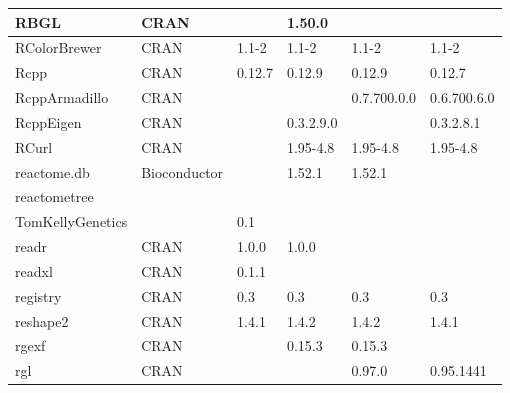 \begin{longtable}{|llllll|}
RBGL                          & CRAN                      &             & 1.50.0      &                &                   \\ \hline \rowcolor{gray!25}
RColorBrewer                  & CRAN                      & 1.1-2       & 1.1-2       & 1.1-2          & 1.1-2            \\ \hline
Rcpp                          & CRAN                      & 0.12.7      & 0.12.9      & 0.12.9         & 0.12.7            \\ \hline \rowcolor{gray!25}
RcppArmadillo                 & CRAN                      &             &             & 0.7.700.0.0    & 0.6.700.6.0      \\ \hline
RcppEigen                     & CRAN                      &             & 0.3.2.9.0   &                & 0.3.2.8.1         \\ \hline \rowcolor{gray!25}
RCurl                         & CRAN                      &             & 1.95-4.8    & 1.95-4.8       & 1.95-4.8         \\ \hline
reactome.db                   & Bioconductor              &             & 1.52.1      & 1.52.1         &                   \\ \hline \rowcolor{gray!25}
reactometree                  & \begin{tabular}[c]{@{}l@{}}GitHub \\ TomKellyGenetics \end{tabular}  &             & 0.1         &                &                  \\ \hline
readr                         & CRAN                      & 1.0.0       & 1.0.0       &                &                   \\ \hline \rowcolor{gray!25}
readxl                        & CRAN                      & 0.1.1       &             &                &                  \\ \hline
registry                      & CRAN                      & 0.3         & 0.3         & 0.3            & 0.3               \\ \hline \rowcolor{gray!25}
reshape2                      & CRAN                      & 1.4.1       & 1.4.2       & 1.4.2          & 1.4.1            \\ \hline
rgexf                         & CRAN                      &             & 0.15.3      & 0.15.3         &                   \\ \hline \rowcolor{gray!25}
rgl                           & CRAN                      &             &             & 0.97.0         & 0.95.1441        \\ \hline

\end{longtable}
